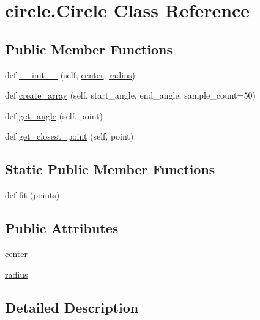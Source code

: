 \hypertarget{classcircle_1_1_circle}{}\section{circle.\+Circle Class Reference}
\label{classcircle_1_1_circle}
\subsection*{Public Member Functions}
\begin{DoxyCompactItemize}
\item 
def \hyperlink{classcircle_1_1_circle_ae5573aa3ec1e6df913e13c01cf3ed7b9}{\+\_\+\+\_\+init\+\_\+\+\_\+} (self, \hyperlink{classcircle_1_1_circle_aa2ed466736c7e4436ab6ded456ebd24b}{center}, \hyperlink{classcircle_1_1_circle_a33aec6cd768f0a1850fae92cf3fcbc95}{radius})
\item 
def \hyperlink{classcircle_1_1_circle_a95ddced3abdbd659ea243a1d420a8c6c}{create\+\_\+array} (self, start\+\_\+angle, end\+\_\+angle, sample\+\_\+count=50)
\item 
def \hyperlink{classcircle_1_1_circle_a1ec1a241492841bc729e660788684407}{get\+\_\+angle} (self, point)
\item 
def \hyperlink{classcircle_1_1_circle_a191eb7323e7138ce625cc345822bff17}{get\+\_\+closest\+\_\+point} (self, point)
\end{DoxyCompactItemize}
\subsection*{Static Public Member Functions}
\begin{DoxyCompactItemize}
\item 
def \hyperlink{classcircle_1_1_circle_a755e5bf15cddcd1a3e20804ece765aba}{fit} (points)
\end{DoxyCompactItemize}
\subsection*{Public Attributes}
\begin{DoxyCompactItemize}
\item 
\hyperlink{classcircle_1_1_circle_aa2ed466736c7e4436ab6ded456ebd24b}{center}
\item 
\hyperlink{classcircle_1_1_circle_a33aec6cd768f0a1850fae92cf3fcbc95}{radius}
\end{DoxyCompactItemize}


\subsection{Detailed Description}


